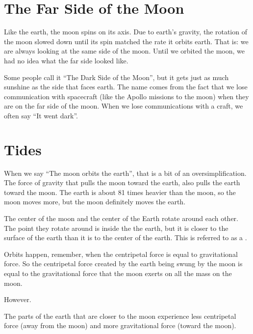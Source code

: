  
\section{The Far Side of the Moon}

Like the earth, the moon spins on its axis. Due to earth's gravity, the rotation of the moon slowed down until its spin matched the rate it orbits earth. That is: we are always looking at the same side of the moon. Until we orbited the moon, we had no idea what the far side looked like.



Some people call it ``The Dark Side of the Moon'', but it gets just as much sunshine as the side that faces earth.  The name comes from the fact that we lose communication with spacecraft (like the Apollo missions to the moon) when they are on the far side of the moon.  When we lose communications with a craft, we often say ``It went dark''.

\section{Tides}
When we say ``The moon orbits the earth'', that is a bit of an oversimplification. The force of gravity that pulls the moon toward the earth, also pulls the earth toward the moon. The earth is about 81 times heavier
than the moon, so the moon moves more, but the moon definitely moves the earth.

The center of the moon and the center of the Earth rotate around each other. The point they rotate around is inside the the earth, but it is closer to the surface of the earth than it is to the center of the earth. This is referred to as a .

Orbits happen, remember, when the centripetal force is equal to gravitational force. So the centripetal force created by the earth being swung by the moon is equal to the gravitational force that the moon exerts on all the mass on the moon.

However.  

The parts of the earth that are closer to the moon experience less centripetal force (away from the moon) and more gravitational force (toward the moon).

